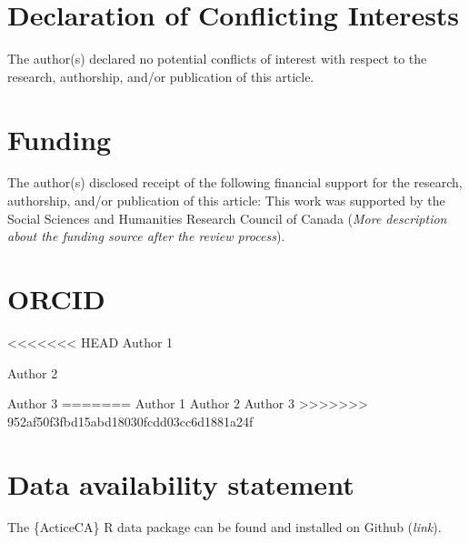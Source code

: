 \documentclass[Royal,times,sageh]{sagej}
\begin{document}
\hypertarget{declaration-of-conflicting-interests}{%
\section{Declaration of Conflicting
Interests}\label{declaration-of-conflicting-interests}}

The author(s) declared no potential conflicts of interest with respect
to the research, authorship, and/or publication of this article.

\hypertarget{funding}{%
\section{Funding}\label{funding}}

The author(s) disclosed receipt of the following financial support for
the research, authorship, and/or publication of this article: This work
was supported by the Social Sciences and Humanities Research Council of
Canada (\emph{More description about the funding source after the review
process}).

\hypertarget{orcid}{%
\section{ORCID}\label{orcid}}

<<<<<<< HEAD
Author 1

Author 2

Author 3
=======
Author 1 Author 2 Author 3
>>>>>>> 952af50f3fbd15abd18030fcdd03cc6d1881a24f

\hypertarget{data-availability-statement}{%
\section{Data availability
statement}\label{data-availability-statement}}

The \{ActiceCA\} R data package can be found and installed on Github
(\emph{link}).



\end{document}
